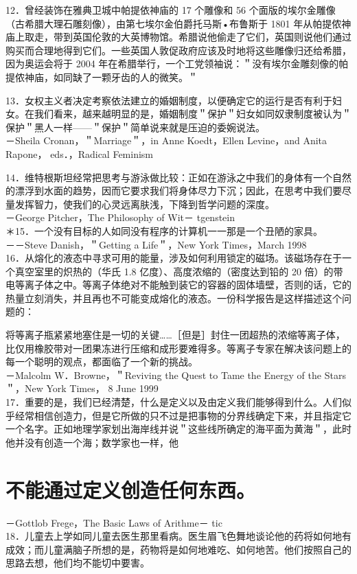 12．曾经装饰在雅典卫城中帕提依神庙的 17 个雕像和 56 个面版的埃尔金雕像（古希腊大理石雕刻像），由第七埃尔金伯爵托马斯•布鲁斯于 1801 年从帕提侬神庙上取走，带到英国伦敦的大英博物馆。希腊说他偷走了它们，英国则说他们通过购买而合理地得到它们。一些英国人敦促政府应该及时地将这些雕像归还给希腊，因为奥运会将于 2004 年在希腊举行，一个工党领袖说：＂没有埃尔金雕刻像的帕提侬神庙，如同缺了一颗牙齿的人的微笑。＂

13．女权主义者决定考察依法建立的婚姻制度，以便确定它的运行是否有利于妇女。在我们看来，越来越明显的是，婚姻制度＂保护＂妇女如同奴隶制度被认为＂保护＂黑人一样——＂保护＂简单说来就是压迫的委婉说法。\\
－Sheila Cronan，＂Marriage＂，in Anne Koedt，Ellen Levine，and Anita Rapone， eds．，Radical Feminism

14．维特根斯坦经常把思考与游泳做比较：正如在游泳之中我们的身体有一个自然的漂浮到水面的趋势，因而它要求我们将身体尽力下沉；因此，在思考中我们要尽量发挥智力，使我们的心灵远离肤浅，下降到哲学问题的深度。\\
－George Pitcher，The Philosophy of Wit－ tgenstein\\
＊15．一个没有目标的人如同没有程序的计算机一一那是一个丑陋的家具。\\
－－Steve Danish，＂Getting a Life＂，New York Times，March 1998\\
16．从熔化的液态中寻求可用的能量，涉及如何利用锁定的磁场。该磁场存在于一个真空室里的炽热的（华氏 1.8 亿度）、高度浓缩的（密度达到铅的 20 倍）的带电等离子体之中。等离子体绝对不能触到装它的容器的固体墙壁，否则的话，它的热量立刻消失，并且再也不可能变成熔化的液态。一份科学报告是这样描述这个问题的：

将等离子瓶紧紧地塞住是一切的关键……［但是］封住一团超热的浓缩等离子体，比仅用橡胶带对一团果冻进行压缩和成形要难得多。等离子专家在解决该问题上的每一个聪明的观点，都面临了一个新的挑战。\\
－Malcolm W．Browne，＂Reviving the Quest to Tame the Energy of the Stars＂，New York Times， 8 June 1999\\
17．重要的是，我们已经清楚，什么是定义以及由定义我们能够得到什么。人们似乎经常相信创造力，但是它所做的只不过是把事物的分界线确定下来，并且指定它一个名字。正如地理学家划出海岸线并说＂这些线所确定的海平面为黄海＂，此时他并没有创造一个海；数学家也一样，他

\section*{不能通过定义创造任何东西。}
－Gottlob Frege，The Basic Laws of Arithme－ tic\\
18．儿童去上学如同儿童去医生那里看病。医生眉飞色舞地谈论他的药将如何地有成效；而儿童满脑子所想的是，药物将是如何地难吃、如何地苦。他们按照自己的思路去想，他们均不能切中要害。

